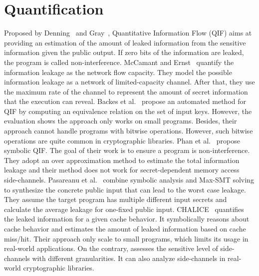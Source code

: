 \section{Quantification}
Proposed by Denning~\cite{robling1982cryptography} and Gray~\cite{gray1992toward},
Quantitative Information Flow (QIF) aims at providing an estimation of the amount of leaked information from the sensitive information given the public output. If zero bits
of the information are leaked, the program is called non-interference. 
McCamant and Ernst~\cite{McCamantE2008} quantify the information leakage as the network
flow capacity. They model the possible information leakage as a network of limited-capacity
channel. After that, they use the maximum rate of the channel to represent the amount of 
secret information that the execution can reveal.
Backes et al.~\cite{5207642} propose an automated method for QIF
by computing an equivalence relation on the set of input keys. However,
the evaluation shows the approach only works on small programs.
Besides, their approach cannot handle programs with bitwise operations.
However, such bitwise operations are quite common in cryptographic libraries.
Phan et al.~\cite{Phan:2012:SQI:2382756.2382791} propose symbolic QIF. The goal of their
work is to ensure a program is non-interference. They adopt an over
approximation method to estimate the total information leakage and their method
does not work for secret-dependent memory access side-channels.
Pasareanu et al.~\cite{pasareanu2016multi} combine symbolic analysis and Max-SMT solving to synthesize the concrete public input that can lead to the worst case leakage. They assume the target program has multiple different input secrets and calculate the average leakage for one-fixed public input.
CHALICE~\cite{Chattopadhyay:2017:QIL:3127041.3127044} quantifies the leaked
information for a given cache behavior.
It symbolically reasons about cache
behavior and estimates the amount of leaked information based on cache miss/hit.
Their approach only scale to small programs, which limits its usage in
real-world applications. On the contrary, \tool{} assesses the sensitive level
of side-channels with different granularities. It can also analyze side-channels
in real-world cryptographic libraries.

